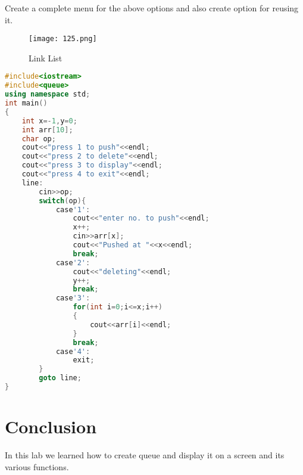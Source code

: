 \documentclass[11pt]{article}            %
\begin{document}
Create a complete menu for the above options and also create option for reusing it.

\begin{figure*}
\centering
  \texttt{[image: 125.png]}
\caption{Link List}
\label{Figure:3}    
\end{figure*}

\begin{lstlisting}[language=C++]
#include<iostream>
#include<queue>
using namespace std;
int main()
{
	int x=-1,y=0;
	int arr[10];
	char op;
	cout<<"press 1 to push"<<endl;
	cout<<"press 2 to delete"<<endl;
	cout<<"press 3 to display"<<endl;
	cout<<"press 4 to exit"<<endl;
	line:
		cin>>op;
		switch(op){
			case'1':
				cout<<"enter no. to push"<<endl;
				x++;
				cin>>arr[x];
				cout<<"Pushed at "<<x<<endl;
				break;
			case'2':
				cout<<"deleting"<<endl;
				y++;
				break;
			case'3':
				for(int i=0;i<=x;i++)
				{
					cout<<arr[i]<<endl;
				}
				break;
			case'4':
				exit;
		}
		goto line;
}
\end{lstlisting}

\section{Conclusion}  
In this lab we learned how to create queue and display it on a screen and its various functions.

 
\end{document}
